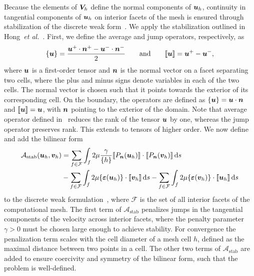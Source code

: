 \documentclass{WileyMSP-template}
\begin{document}
Because the elements of $\bm{V}_h$ define the normal components of $\bm{u}_h$,
continuity in tangential components of $\bm{u}_h$ on interior facets of
the mesh is ensured through stabilization
of the discrete weak form~.
We apply the stabilization outlined in Hong~\emph{et al.}~\cite{Hong2016AEquations}.
First, we define the average and jump operators, respectively, as
\begin{equation}
    \{\bm{u}\} = \frac{\bm{u}^+\cdot\bm{n}^+ - \bm{u}^-\cdot\bm{n}^-}{2}
    \qquad\mathrm{and}\qquad \llbracket\bm{u}\rrbracket = \bm{u}^+ - \bm{u}^-,
    \label{eq:operators_BDM}
\end{equation}
where $\bm{u}$ is a first-order tensor and 
$\bm{n}$ is the normal vector on a facet separating two cells,
where the plus and minus signs denote variables in each of the two cells.
The normal vector is chosen such that it points towards the exterior of
its corresponding cell. On the boundary, the operators are defined as
$\{\bm{u}\} = \bm{u}\cdot\bm{n}$ and $\llbracket\bm{u}\rrbracket = \bm{u}$,
with $\bm{n}$ pointing to the exterior of the domain. Note that average operator
defined in~ reduces the rank of the tensor $\bm{u}$ by one,
whereas the jump operator preserves rank. This extends to tensors of higher order.
We now define and add the bilinear form
\begin{align*}
    \mathcal{A}_{\mathrm{stab}}(\bm{u}_h, \bm{v}_h) &=
    \sum_{f\in \mathcal{F}}\int_f{2\mu\frac{\gamma}{\{h\}}\llbracket P_{\bm{n}}(\bm{u}_h)\rrbracket
    \cdot\llbracket P_{\bm{n}}(\bm{v}_h)\rrbracket}\,\mathrm ds\\
    &-\sum_{f\in \mathcal{F}}\int_f{2\mu\{\bm{\varepsilon}(\bm{u}_h)\}\cdot\llbracket\bm{v}_h\rrbracket}\,\mathrm ds
    -\sum_{f\in \mathcal{F}}\int_f{2\mu\{\bm{\varepsilon}(\bm{v}_h)\}\cdot\llbracket\bm{u}_h\rrbracket}\,\mathrm ds
\end{align*}
to the discrete weak formulation~,
where $\mathcal{F}$ is the set of all interior facets of the computational mesh.
The first term of $\mathcal{A}_{\mathrm{stab}}$ penalizes jumps
in the tangential components of the velocity
across interior facets, where the penalty parameter $\gamma>0$ must be chosen large enough
to achieve stability. For convergence the penalization term
scales with the cell diameter of a mesh cell $h$,
defined as the maximal distance between two points in a cell. The other two terms
of $\mathcal{A}_{\mathrm{stab}}$ are added to ensure coercivity and symmetry of
the bilinear form, such that the problem is well-defined.
\end{document}
